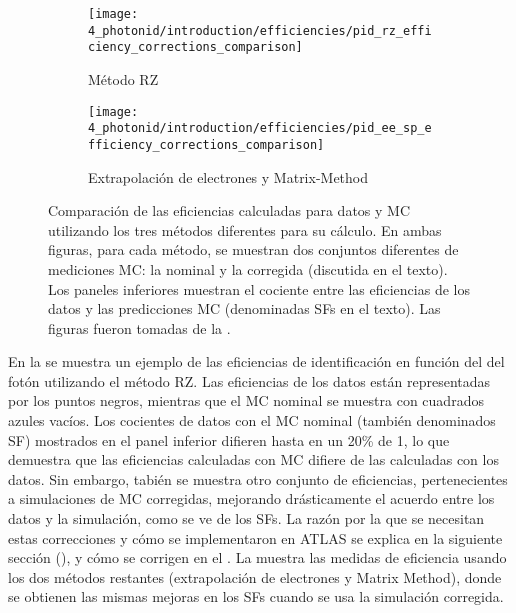 \begin{figure}[ht!]
    \centering
    \begin{subfigure}[h]{0.49\linewidth}
        \centering
        \texttt{[image: 4\_photonid/introduction/efficiencies/pid\_rz\_efficiency\_corrections\_comparison]}
        \caption{M\'etodo \acf{RZ}}
        \label{fig:pid_ss:pid:efficiencies:efficiencies_old:rz}
    \end{subfigure}
    \hfill
    \begin{subfigure}[h]{0.49\linewidth}
        \centering
        \texttt{[image: 4\_photonid/introduction/efficiencies/pid\_ee\_sp\_efficiency\_corrections\_comparison]}
        \caption{Extrapolaci\'on de electrones y Matrix-Method}
        \label{fig:pid_ss:pid:efficiencies:efficiencies_old:ee_sp}
    \end{subfigure}
    \caption{Comparación de las eficiencias calculadas para datos y \ac{MC} utilizando los tres m\'etodos diferentes para su c\'alculo. En ambas figuras, para cada método, se muestran dos conjuntos diferentes de mediciones \ac{MC}: la nominal y la corregida (discutida en el texto). Los paneles inferiores muestran el cociente entre las eficiencias de los datos y las predicciones \ac{MC} (denominadas \acfp{SF} en el texto). Las figuras fueron tomadas de la .}
    \label{fig:pid_ss:pid:efficiencies:efficiencies_old}
\end{figure}


En la \Fig{\ref{fig:pid_ss:pid:efficiencies:efficiencies_old:rz}} se muestra un ejemplo de las eficiencias de identificación en función del \pt del fotón utilizando el método \ac{RZ}. Las eficiencias de los datos están representadas por los puntos negros, mientras que el \ac{MC} nominal se muestra con cuadrados azules vacíos. Los cocientes de datos con el \ac{MC} nominal (también denominados \acf{SF}) mostrados en el panel inferior difieren hasta en un 20\% de 1, lo que demuestra que las eficiencias calculadas con \ac{MC} difiere de las calculadas con los datos. Sin embargo, tabi\'en se muestra otro conjunto de eficiencias, pertenecientes a simulaciones de \ac{MC} corregidas, mejorando drásticamente el acuerdo entre los datos y la simulación, como se ve de los \acp{SF}. La razón por la que se necesitan estas correcciones y cómo se implementaron en \ac{ATLAS} se explica en la siguiente sección (\Sect{\ref{sec:pid_ss:ss_differences}}), y cómo se corrigen en el \Ch{\ref{ch:ss_corrections}}. La \Fig{\ref{fig:pid_ss:pid:efficiencies:efficiencies_old:ee_sp}} muestra las medidas de eficiencia usando los dos métodos restantes (extrapolación de electrones y Matrix Method), donde se obtienen las mismas mejoras en los \acp{SF} cuando se usa la simulación corregida.

